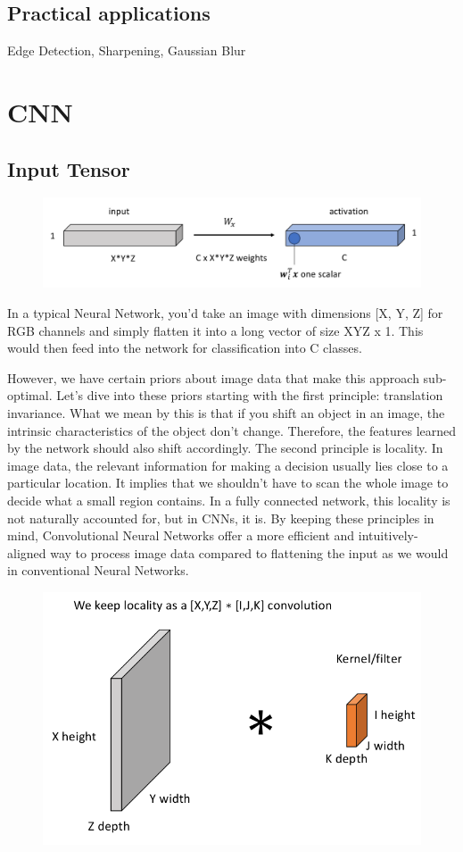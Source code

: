 \documentclass[11pt]{article}
\begin{document}
\subsection{Practical applications}

Edge Detection, Sharpening, Gaussian Blur

\section{CNN}

\subsection{Input Tensor}

\begin{figure}[H]
    \centering
    \includegraphics[width=\linewidth]{figures/input-tensor.png}
\end{figure}

In a typical Neural Network, you'd take an image with dimensions [X, Y, Z] for RGB channels and simply flatten it into a long vector of size XYZ x 1. This would then feed into the network for classification into C classes.

However, we have certain priors about image data that make this approach sub-optimal. Let's dive into these priors starting with the first principle: translation invariance. What we mean by this is that if you shift an object in an image, the intrinsic characteristics of the object don't change. Therefore, the features learned by the network should also shift accordingly. The second principle is locality. In image data, the relevant information for making a decision usually lies close to a particular location. It implies that we shouldn't have to scan the whole image to decide what a small region contains. In a fully connected network, this locality is not naturally accounted for, but in CNNs, it is. By keeping these principles in mind, Convolutional Neural Networks offer a more efficient and intuitively-aligned way to process image data compared to flattening the input as we would in conventional Neural Networks.

\begin{figure}[H]
    \centering
    \includegraphics[width=.6\linewidth]{figures/Kernel.png}
\end{figure}
\end{document}
